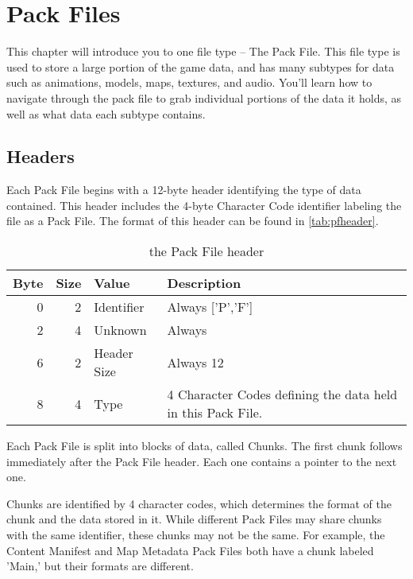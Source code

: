 \chapter{Pack Files}
\label{chap:packfiles}

This chapter will introduce you to one file type -- The Pack File.  This file
type is used to store a large portion of the game data, and has many subtypes
for data such as animations, models, maps, textures, and audio.  You'll learn
how to navigate through the pack file to grab individual portions of the data
it holds, as well as what data each subtype contains.

\section{Headers}
\label{sec:pfheaders}

Each Pack File begins with a 12-byte header identifying the type of data
contained.  This header includes the 4-byte Character Code identifier labeling
the file as a Pack File. The format of this header can be found in
\autoref{tab:pfheader}.

\begin{table}[htp]\begin{center}
	\caption{the Pack File header}
	\label{tab:pfheader}
	
	\begin{tabular}{|r|r|l|p{2.5in}|}
		\hline
		\textbf{Byte} & \textbf{Size} & \textbf{Value} & \textbf{Description} \\
		\hline
		0 & 2 & Identifier  & Always ['P','F'] \\
		\hline
		2 & 4 & Unknown     & Always \hex{1} \\
		\hline
		6 & 2 & Header Size & Always 12 \\
		\hline
		8 & 4 & Type        & 4 Character Codes defining the data held in this
		                      Pack File. \\
		\hline
	\end{tabular}
\end{center}\end{table}

Each Pack File is split into blocks of data, called Chunks.  The first chunk
follows immediately after the Pack File header.  Each one contains a pointer
to the next one.

Chunks are identified by 4 character codes, which determines the format of the
chunk and the data stored in it.  While different Pack Files may share chunks
with the same identifier, these chunks may not be the same.  For example, the
Content Manifest and Map Metadata Pack Files both have a chunk labeled 'Main,'
but their formats are different.

